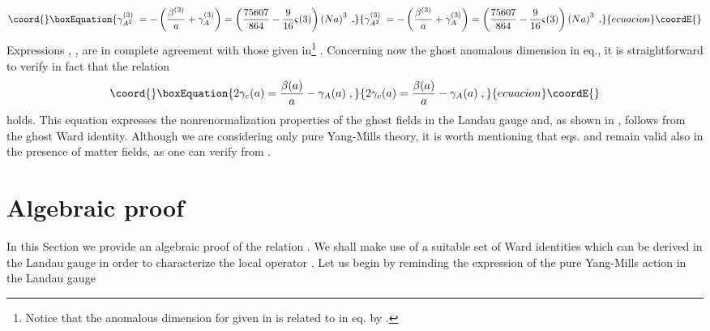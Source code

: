 \documentclass[a4paper,12pt]{article}
\begin{document}
\begin{equation}\coord{}\boxEquation{
\gamma _{A^{2}}^{(3)}\;=-\left( \frac{\beta ^{(3)}}{a}+\gamma
_{A}^{(3)}\right) =\left( \frac{75607}{864}-\frac{9}{16}\varsigma (3)\right)
\left( Na\right) ^{3}\;.  \label{a23}
}{
\gamma _{A^{2}}^{(3)}\;=-\left( \frac{\beta ^{(3)}}{a}+\gamma
_{A}^{(3)}\right) =\left( \frac{75607}{864}-\frac{9}{16}\varsigma (3)\right)
\left( Na\right) ^{3}\;.  }{ecuacion}\coordE{}\end{equation}
Expressions \myHighlight{$\left( \ref{aa1}\right) $}\coordHE{}, \myHighlight{$\left( \ref{aa2}\right) $}\coordHE{}, \myHighlight{$\left( 
\ref{a23}\right) $}\coordHE{} are in complete agreement with those given in\footnote{%
Notice that the anomalous dimension \coordHE{} for \coordHE{} given in \cite
{gr} is related to \coordHE{} in eq.\myHighlight{$\left( \ref{ga2}\right) $}\coordHE{} by \coordHE{}.} \cite{gr}. Concerning now the ghost
anomalous dimension \coordHE{} in eq.\myHighlight{$\left( \ref{gc}\right) $}\coordHE{}, it is
straightforward to verify in fact that the relation 
\begin{equation}\coord{}\boxEquation{
2\gamma _{c}(a)=\frac{\beta (a)}{a}-\gamma _{A}(a)\;,  \label{rel}
}{
2\gamma _{c}(a)=\frac{\beta (a)}{a}-\gamma _{A}(a)\;,  }{ecuacion}\coordE{}\end{equation}
holds. This equation expresses the nonrenormalization properties of the
ghost fields in the Landau gauge and, as shown in \cite{bps}, follows from
the ghost Ward identity. Although we are considering only pure Yang-Mills
theory, it is worth mentioning that eqs.\myHighlight{$\left( \ref{ga2}\right) $}\coordHE{} and \myHighlight{$%
\left( \ref{rel}\right) $}\coordHE{} remain valid also in the presence of matter
fields, as one can verify from \cite{gr}.

\section{Algebraic proof}

In this Section we provide an algebraic proof of the relation \myHighlight{$\left( \ref
{ga2}\right) $}\coordHE{}. We shall make use of a suitable set of Ward identities which
can be derived in the Landau gauge in order to characterize the local
operator \coordHE{}. Let us begin by reminding the expression of the pure
Yang-Mills action in the Landau gauge
\end{document}
